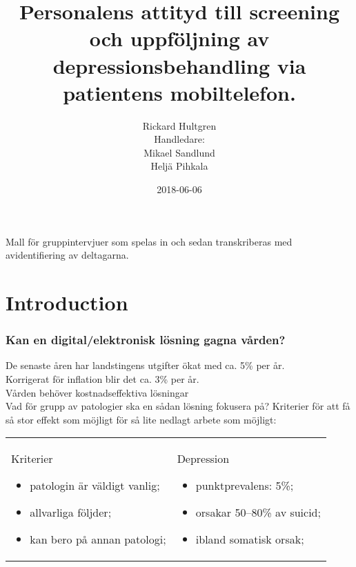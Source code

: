 \documentclass[english]{beamer}
\date{2018-06-06}
\begin{document}
\title[]{Personalens attityd till screening och uppföljning av depressionsbehandling via patientens mobiltelefon.}

\author[Rickard Hultgren]{Rickard Hultgren\\[10mm]{\small Handledare:\\ Mikael Sandlund\\ Heljä Pihkala}}


\begin{frame}
	\titlepage
	Mall för gruppintervjuer som spelas in och sedan transkriberas med avidentifiering av deltagarna.
\end{frame}

\section{Introduction}

\begin{frame}
	\frametitle{Kan en digital/elektronisk lösning gagna vården?}
	De senaste åren har landstingens utgifter ökat med ca. 5\% per år.\\
	Korrigerat för inflation blir det ca. 3\% per år.\\
	Vården behöver kostnadseffektiva lösningar\\
	Vad för grupp av patologier ska en sådan lösning fokusera på?
	Kriterier för att få så stor effekt som möjligt för så lite nedlagt arbete som möjligt:
	\begin{tabular}{p{}p{}}
	\vspace{.1em}Kriterier\begin{itemize}
	\item patologin är väldigt vanlig;
	\item allvarliga följder;
	\item kan bero på annan patologi;
	\end{itemize} & \pause Depression\begin{itemize}
	\item punktprevalens: 5\%;
	\item orsakar 50--80\% av suicid;
	\item ibland somatisk orsak;
	\end{itemize}
	\end{tabular}
\end{frame}
\end{document}
